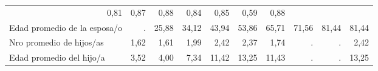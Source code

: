 \begin{tabular}{llllllllll}
  \multicolumn{1}{r}{0,81} &
  \multicolumn{1}{r}{0,87} &
  \multicolumn{1}{r}{0,88} &
  \multicolumn{1}{r}{0,84} &
  \multicolumn{1}{r}{0,85} &
  \multicolumn{1}{r}{0,59} &
  \multicolumn{1}{r}{0,88} \\
\multicolumn{1}{l}{\hspace{2em}Edad promedio de la esposa/o} &
  \multicolumn{1}{|r}{.} &
  \multicolumn{1}{r}{25,88} &
  \multicolumn{1}{r}{34,12} &
  \multicolumn{1}{r}{43,94} &
  \multicolumn{1}{r}{53,86} &
  \multicolumn{1}{r}{65,71} &
  \multicolumn{1}{r}{71,56} &
  \multicolumn{1}{r}{81,44} &
  \multicolumn{1}{r}{81,44} \\
\multicolumn{1}{l}{\hspace{2em}Nro promedio de hijos/as} &
  \multicolumn{1}{|r}{1,62} &
  \multicolumn{1}{r}{1,61} &
  \multicolumn{1}{r}{1,99} &
  \multicolumn{1}{r}{2,42} &
  \multicolumn{1}{r}{2,37} &
  \multicolumn{1}{r}{1,74} &
  \multicolumn{1}{r}{.} &
  \multicolumn{1}{r}{.} &
  \multicolumn{1}{r}{2,42} \\
\multicolumn{1}{l}{\hspace{2em}Edad promedio del hijo/a} &
  \multicolumn{1}{|r}{3,52} &
  \multicolumn{1}{r}{4,00} &
  \multicolumn{1}{r}{7,34} &
  \multicolumn{1}{r}{11,42} &
  \multicolumn{1}{r}{13,25} &
  \multicolumn{1}{r}{11,43} &
  \multicolumn{1}{r}{.} &
  \multicolumn{1}{r}{.} &
  \multicolumn{1}{r}{13,25} \\
\cline{1-10}
\end{tabular}
